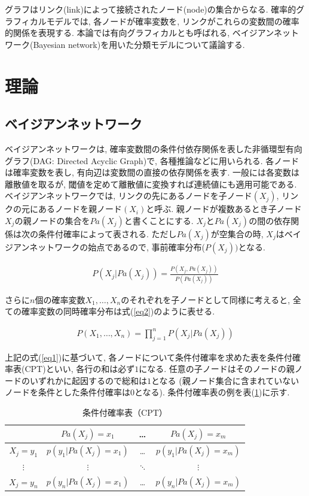 \documentclass[a4paper]{jarticle}
\begin{document}
グラフはリンク(link)によって接続されたノード(node)の集合からなる. 確率的グラフィカルモデルでは, 各ノードが確率変数を, リンクがこれらの変数間の確率的関係を表現する. 本論では有向グラフィカルとも呼ばれる, ベイジアンネットワーク(Bayesian network)を用いた分類モデルについて議論する.

\section{理論}

\subsection{ベイジアンネットワーク}

ベイジアンネットワークは, 確率変数間の条件付依存関係を表した非循環型有向グラフ(DAG: Directed Acyclic Graph)で, 各種推論などに用いられる. 各ノードは確率変数を表し, 有向辺は変数間の直接の依存関係を表す. 一般には各変数は離散値を取るが, 閾値を定めて離散値に変換すれば連続値にも適用可能である. ベイジアンネットワークでは, リンクの先にあるノードを子ノード$(X_j)$, リンクの元にあるノードを親ノード$(X_i)$と呼ぶ. 親ノードが複数あるとき子ノード$X_j$の親ノードの集合を$Pa(X_j)$と書くことにする. $X_j$と$Pa(X_j)$の間の依存関係は次の条件付確率によって表される. ただし$Pa(X_j)$が空集合の時, $X_j$はベイジアンネットワークの始点であるので, 事前確率分布($P(X_j))$となる.

\begin{eqnarray}
\label{eq1}
P(X_j | Pa(X_j)) = \frac{P(X_j, Pa(X_j))}{P(Pa(X_j))} 
\end{eqnarray}

さらに$n$個の確率変数$X_1, \dots, X_n$のそれぞれを子ノードとして同様に考えると, 全ての確率変数の同時確率分布は式(\ref{eq2})のように表せる.

\begin{eqnarray}
\label{eq2}
P(X_1, \dots, X_n) = \prod_{j=1}^n P(X_j | Pa(X_j))
\end{eqnarray}

上記の式(\ref{eq1})に基づいて, 各ノードについて条件付確率を求めた表を条件付確率表(CPT)といい, 各行の和は必ず$1$になる. 任意の子ノードはそのノードの親ノードのいずれかに起因するので総和は$1$となる (親ノード集合に含まれていないノードを条件とした条件付確率は$0$となる). 条件付確率表の例を表(\ref{cpt})に示す. 

\begin{table}[H]
\begin{center}
\caption{条件付確率表（CPT）}   %
\label{cpt}   %
\begin{tabular}{|c||c|c|c|}   %
\hline
 & $Pa(X_{j})=x_{1}$ & \dots & $Pa(X_{j})=x_{m}$
\\ \hline
$X_j=y_1$ & $p(y_1|Pa(X_j)=x_1)$ & \dots & $p(y_1|Pa(X_j)=x_m)$
\\ \hline
$\vdots$ & $\vdots$ & $\ddots$ & $\vdots$
\\ \hline
$X_j=y_n$ & $ p(y_n|Pa(X_j)=x_1)$ & \dots & $p(y_n|Pa(X_j)=x_m)$
\\ \hline
\end{tabular}
\end{center}
\end{table}
\end{document}
